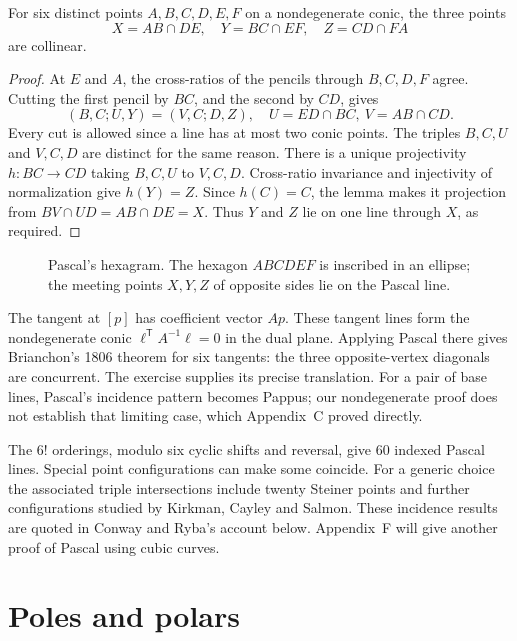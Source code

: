 \begin{theorem}[Pascal]\label{geometry:thm:pascal}
For six distinct points $A,B,C,D,E,F$ on a nondegenerate conic, the three points
\[
X=AB\cap DE,\quad Y=BC\cap EF,\quad Z=CD\cap FA
\]
are collinear.
\end{theorem}
\begin{proof}
At $E$ and $A$, the cross-ratios of the pencils through $B,C,D,F$ agree. Cutting the first pencil by $BC$, and the second by $CD$, gives
\[
(B,C;U,Y)=(V,C;D,Z),\quad
U=ED\cap BC,\ V=AB\cap CD.
\]
Every cut is allowed since a line has at most two conic points. The triples $B,C,U$ and $V,C,D$ are distinct for the same reason. There is a unique projectivity $h:BC\to CD$ taking $B,C,U$ to $V,C,D$. Cross-ratio invariance and injectivity of normalization give $h(Y)=Z$. Since $h(C)=C$, the lemma makes it projection from $BV\cap UD=AB\cap DE=X$. Thus $Y$ and $Z$ lie on one line through $X$, as required.
\end{proof}

\begin{figure}[ht]
\centering
{}
\caption{Pascal's hexagram. The hexagon $ABCDEF$ is inscribed in an ellipse; the meeting points $X,Y,Z$ of opposite sides lie on the Pascal line.}
\label{geometry:fig:pascal}
\end{figure}

The tangent at $[p]$ has coefficient vector $Ap$. These tangent lines form the nondegenerate conic $\ell^{\mathsf T}A^{-1}\ell=0$ in the dual plane. Applying Pascal there gives Brianchon's 1806 theorem for six tangents: the three opposite-vertex diagonals are concurrent. The exercise supplies its precise translation. For a pair of base lines, Pascal's incidence pattern becomes Pappus; our nondegenerate proof does not establish that limiting case, which Appendix~C proved directly.

\begin{remark}
The $6!$ orderings, modulo six cyclic shifts and reversal, give $60$ indexed Pascal lines. Special point configurations can make some coincide. For a generic choice the associated triple intersections include twenty Steiner points and further configurations studied by Kirkman, Cayley and Salmon. These incidence results are quoted in Conway and Ryba's account below. Appendix~F will give another proof of Pascal using cubic curves.
\end{remark}

\section{Poles and polars}

